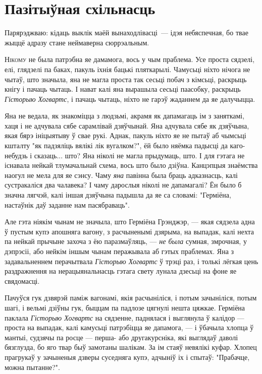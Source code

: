 
\chapter{Пазітыўная схільнасць}

\begin{chapterOpeningQuote}
  Парярэджваю: кідаць выклік маёй вынаходлівасці~--- ідэя небяспечная,
  бо твае жыццё адразу стане неймаверна сюррэальным.
\end{chapterOpeningQuote}

\lettrine{Н}{ікому} не была патрэбна яе дамамога, вось у чым праблема.
Усе проста сядзелі, елі, глядзелі па баках, пакуль іхнія бацькі пляткарылі.
Чамусьці ніхто нічога не чытаў, што значыла, яна не магла проста так 
сесьці побач з кімсьці, раскрыць кнігу і пачаць чытаць. І нават калі яна вырашыла сесьці 
паасобку, раскрыць \emph{Гісторыю Хогвартс}, і пачаць чытаць, ніхто не гарэў 
жаданнем да яе далучыцца. 

Яна не ведала, як знакоміцца з людзьмі, акрамя як дапамагаць ім з заняткамі, хаця 
і не адчувала сябе сарамлівай дзяўчынай. Яна адчувала сябе як дзяўчына, якая бярэ
ініцыятыву ў свае рукі. Аднак, пакуль ніхто яе не пытаў аб чымсьці кшталту 
"як падзяліць вялікі лік вугалком?", ёй было няёмка падысці да каго-небудзь і 
сказаць... што? Яна ніколі не магла прыдумаць, што. І для гэтага не існавала 
нейкай тлумачальнай схема, вось што было дзіўна. Канцэпцыя знаёмства наогул 
не мела для яе сэнсу. Чаму \emph{яна} павінна была браць адказнасць, калі сустракаліся
два чалавека? І чаму дарослыя ніколі не дапамагалі? Ён было б значна лягчэй, калі
іншая дзяўчына падышла да яе са словамі: "Герміёна, настаўнік даў заданне нам пасябраваць".

Але гэта ніякім чынам не значыла, што Герміёна Грэнджэр, --- якая сядзела адна ў пустым 
купэ апошняга вагону, з расчыненымі дзярыма, на выпадак, калі нехта па нейкай прычыне
захоча з ёю паразмаўляць, --- \emph{не была} сумная, змрочная, у дэпрэсіі, або нейкім іншым 
чынам перажывала аб гэтых праблемах. Яна з задавальненнем перачытвала \emph{Гісторыю Хогвартс}
ў трэці раз, і толькі лёгкая цень раздражнення на нерацыянальнасць гэтага свету
лунала дзесьці на фоне яе свядомасці. 

Пачуўся гук дзвярэй паміж вагонамі, якія расчыніліся, і потым зачыніліся, потым
шагі, і вельмі дзіўны гук, быццам па падлозе цягнулі нешта цяжкае. Герміёна паклала 
\emph{Гісторыю Хогвартс} на сядзенне, паднялася і выглянула ў калідор --- проста на 
выпадак, калі камусьці патрэбіцца яе дапамога, --- і ўбачыла хлопца ў мантыі, 
судзячы па росце --- перша- або другакурсніка, які выглядаў даволі бязглузда, бо яго твар
быў замотаны шалікам. За ім стаяў невялікі куфар. Хлопец прагрукаў у зачыненыя дзверы суседняга
купэ, адчыніў іх і спытаў: "Прабачце, можна пытанне?".


